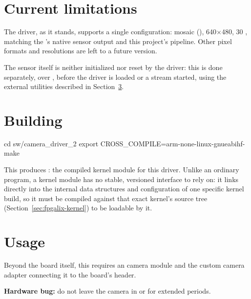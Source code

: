 \section{Current limitations}
\label{sec:fpgalix-camera-limitations}

The driver, as it stands, supports a single configuration:  mosaic (), 640$\times$480, 30 , matching the 's native sensor output and this project's  pipeline. Other pixel formats and resolutions are left to a future version.

The  sensor itself is neither initialized nor reset by the driver: this is done separately, over , before the driver is loaded or a stream started, using the external utilities described in Section~\ref{sec:fpgalix-camera-usage}.

\section{Building}
\label{sec:fpgalix-camera-building}

\begin{shellcodehost}
cd sw/camera_driver_2
export CROSS_COMPILE=arm-none-linux-gnueabihf-
make
\end{shellcodehost}

This produces : the compiled kernel module for this driver. Unlike an ordinary program, a kernel module has no stable, versioned interface to rely on: it links directly into the internal data structures and configuration of one specific kernel build, so it must be compiled against that exact kernel's source tree (Section~\ref{sec:fpgalix-kernel}) to be loadable by it.

\section{Usage}
\label{sec:fpgalix-camera-usage}

Beyond the  board itself, this requires an  camera module and the custom camera adapter connecting it to the board's  header.

\begin{warningbox}
\textbf{Hardware bug:} do not leave the camera in  or  for extended periods.\footnotemark
\end{warningbox}

